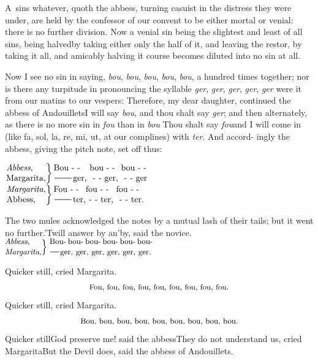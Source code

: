 \documentclass{article}
\begin{document}
\lettrine{A}{\,} sins whatever, quoth the abbess,
turning casuist in the distress they were under, are held by the
confessor of our convent to be either mortal or venial:\break
there is no further division. Now a venial sin being the
slightest and least of all sins,\break
\tsk being halved\tsk by taking either only the half of it, and
leaving the rest\tsk or, by taking it all, and amicably halving
it  course becomes
diluted into no sin at all.

\bigskip
{}\eject

Now I see no sin in saying, \textit{bou}, \textit{bou}, \textit{bou}, \textit{bou},
\textit{bou}, a hundred times together; nor is there any turpitude in pronouncing
the syllable \textit{ger}, \textit{ger}, \textit{ger}, \textit{ger}, \textit{ger}
were it from our matins to our vespers: Therefore, my dear daughter, continued the
abbess of Andouillets\tsk I will say \textit{bou}, and thou shalt say \textit{ger};
and then alternately, as there is no more sin in \textit{fou}
than in \textit{bou}\tsk
Thou shalt say \textit{fou}\tsk and I will come in (like fa,
sol, la, re, mi, ut, at\break
our complines) with \textit{ter}. And accord-\break
ingly the abbess, giving the pitch note,
set off thus:

\noindent$
\left.\vcenter{\halign{#\hss\cr
\textit{Abbess},\cr 
Margarita,\cr}}\right\}
\vcenter{\halign{&#\hss\cr
Bou - - &bou - - &bou - -\cr
\tsh ger, &\hbox to 14pt{ - -} ger, &\hbox to 14pt{ - -} ger\cr}}
$\\[4pt]
$
\left.\vcenter{\halign{#\hss\cr
\textit{Margarita},\cr 
Abbess,\cr}}\right\}
\vcenter{\halign{&#\hss\cr
Fou - - &fou - - &fou - -\cr
\tsh ter,&\hbox to 14pt{ - -} ter, &\hbox to 14pt{ - -} ter.\cr}}
$

\smallskip
{}\eject

The two mules acknowledged the notes by a mutual lash of their tails; but it went no
further.\tsh ’Twill answer by an’\break by, said the novice.\\[6pt]
$
\left.\!\vcenter{\halign{\small #\hss\cr
\textit{Abbess},\cr 
\textit{Margarita},\cr}}\right\}$\,$
\vcenter{\halign{\hbox to 119pt{\small #}\cr
Bou- bou- bou- bou- bou- bou-\cr
\tsk ger, ger, ger, ger, ger, ger.\cr}}$

Quicker still, cried Margarita.
$$\hbox{\small Fou, fou, fou, fou, fou, fou, fou, fou, fou.}$$
\quad Quicker still, cried Margarita.
$$\hbox{\small Bou, bou, bou, bou, bou, bou, bou, bou, bou.}$$
\quad Quicker still\tsk God preserve me! said the abbess\tsk They do not
understand us, cried Margarita\tsh But the Devil does, said the abbess
of Andouillets.
\end{document}
